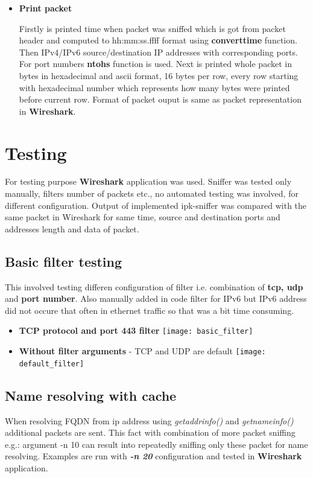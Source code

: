 \documentclass{article}
\begin{document}
\begin{itemize}
	\item \textbf{Print packet} \newline
	
	Firstly is printed time when packet was sniffed which is got from packet header and computed to hh:mm:ss.ffff format using \textbf{convert\textunderscore time} function. Then IPv4/IPv6 source/destination IP addresses with corresponding ports. For port numbers \textbf{ntohs} function is used. Next is printed whole packet in bytes in hexadecimal and ascii format, 16  bytes per row, every row starting with hexadecimal number which represents how many bytes were printed before current row. Format of packet ouput is same as packet representation in \textbf{Wireshark}.

\end{itemize}




\section{Testing}
For testing purpose \textbf{Wireshark} application was used. Sniffer was tested only manually, filters number of packets etc., no automated testing was involved, for different configuration. Output of implemented ipk-sniffer was compared with the same packet in Wireshark for same time, source and destination ports and addresses length and data of packet.

\subsection{Basic filter testing}
This involved testing differen configuration of filter i.e. combination of \textbf{tcp, udp} and \textbf{port number}. Also manually added in code filter for IPv6 but IPv6 address did not occure that often in ethernet traffic so that was a bit time consuming.\newline
\begin{itemize}
  \item \textbf{TCP protocol and port 443 filter}\newline
  \texttt{[image: basic\_filter]}
 \item \textbf{Without filter arguments} - TCP and UDP are default\newline
  \texttt{[image: default\_filter]}
\end{itemize}

\newpage
\subsection{Name resolving with cache}
When resolving FQDN from ip address using \textit{getaddrinfo()} and \textit{getnameinfo()} additional packets are sent. This fact with combination of more packet sniffing e.g.: argument -n 10 can result into repeatedly sniffing only these packet for name resolving.\newline
Examples are run with \textit{\textbf{-n 20}} configuration and tested in \textbf{Wireshark} application.
\end{document}
